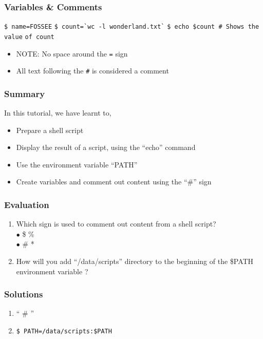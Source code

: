 \documentclass[17pt,compress]{beamer}
\begin{document}
\begin{frame}[fragile]
  \frametitle{Variables \& Comments}
  \verb~$ name=FOSSEE~
  \verb~$ count=`wc -l wonderland.txt`~
  \verb~$ echo $count # Shows the value~
  \verb~of count~
  \begin{itemize}
  \item \alert{NOTE:} No space around the \texttt{=} sign
  \item All text following the \texttt{\#} is considered a comment
  \end{itemize}
\end{frame}

\begin{frame}
\frametitle{Summary}
\label{sec-8}

  In this tutorial, we have learnt to,


\begin{itemize}
\item Prepare a shell script
\item Display the result of a script, using the ``echo'' command
\item Use the environment variable ``PATH''
\item Create variables and comment out content using the ``\#'' sign
\end{itemize}
\end{frame}

\begin{frame}[fragile]
\frametitle{Evaluation}
\label{sec-9}


\begin{enumerate}
\item Which sign is used to comment out content from a shell script?\\
{\color{LimeGreen}$\bullet$} \$ \hspace{80pt}{\color{LimeGreen}$\bullet$} \% \\
{\color{LimeGreen}$\bullet$} \# \hspace{80pt}{\color{LimeGreen}$\bullet$} * \\
\vspace{8pt}
\item How will you add ``/data/scripts'' directory to the beginning of 
    the \$PATH environment variable ?
\end{enumerate}
\end{frame}


\begin{frame}
\frametitle{Solutions}
\label{sec-10}


\begin{enumerate}
\item `` \# ''
\vspace{15pt}
\item \texttt{\$ PATH=/data/scripts:\$PATH}
\end{enumerate}
\end{frame}
\end{document}
